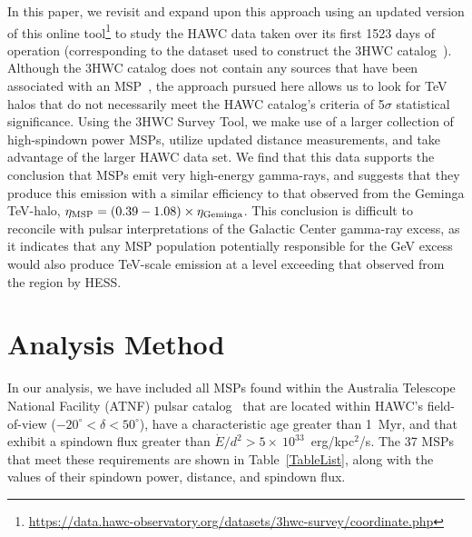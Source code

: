 \documentclass[aps,prd,twocolumn,amsmath,superscriptaddress,amssymb,showpacs,floatfix,nofootinbib,longbibliography,preprintnumbers]{revtex4-1}
\begin{document}
In this paper, we revisit and expand upon this approach using an updated version of this online tool\footnote{\url{https://data.hawc-observatory.org/datasets/3hwc-survey/coordinate.php}} to study the HAWC data taken over its first 1523 days of operation (corresponding to the dataset used to construct the 3HWC catalog~\cite{Albert:2020fua}). Although the 3HWC catalog does not contain any sources that have been associated with an MSP~\cite{Albert:2020fua}, the approach pursued here allows us to look for TeV halos that do not necessarily meet the HAWC catalog's criteria of 5$\sigma$ statistical significance. Using the 3HWC Survey Tool, we make use of a larger collection of high-spindown power MSPs, utilize updated distance measurements, and take advantage of the larger HAWC data set. We find that this data supports the conclusion that MSPs emit very high-energy gamma-rays, and suggests that they produce this emission with a similar efficiency to that observed from the Geminga TeV-halo, $\eta_{\rm MSP} = (0.39-1.08) \times \eta_{\rm Geminga}$. This conclusion is difficult to reconcile with pulsar interpretations of the Galactic Center gamma-ray excess, as it indicates that any MSP population potentially responsible for the GeV excess would also produce TeV-scale emission at a level exceeding that observed from the region by HESS.


\section{Analysis Method}

In our analysis, we have included all MSPs found within the Australia Telescope National Facility (ATNF) pulsar catalog~\cite{Manchester:2004bp} that are located within HAWC's field-of-view ($-20^{\circ} < \delta < 50^{\circ}$), have a characteristic age greater than 1~Myr, and that exhibit a spindown flux greater than \mbox{$\dot{E}/d^2 > 5 \times~10^{33}$~erg/kpc$^2$/s.} The 37 MSPs that meet these requirements are shown in Table~\ref{TableList}, along with the values of their spindown power, distance, and spindown flux.
\end{document}
